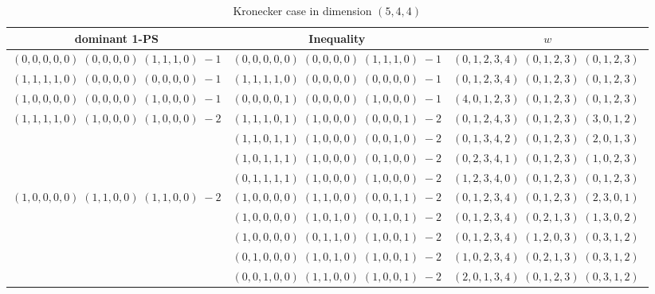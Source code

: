 \documentclass[11pt]{article}
\begin{document}
 
 \begin{longtable}[l]{|c|c|c|} 
 \caption{Kronecker case in dimension $(5,4,4)$} \\  
 
 \hline 
 \textrm{dominant 1-PS} & \textrm{Inequality} & $w$ \\ 
 \hline\multirow[t]{1}{*}{ $(0 ,0 ,0 ,0 ,0) \;(0 ,0 ,0 ,0) \;(1 ,1 ,1 ,0) \;-1$ }  & $(0 ,0 ,0 ,0 ,0) \;(0 ,0 ,0 ,0) \;(1 ,1 ,1 ,0) \;-1$ & $(0 ,1 ,2 ,3 ,4) \;(0 ,1 ,2 ,3) \;(0 ,1 ,2 ,3) \;$\\ \hline\multirow[t]{1}{*}{ $(1 ,1 ,1 ,1 ,0) \;(0 ,0 ,0 ,0) \;(0 ,0 ,0 ,0) \;-1$ }  & $(1 ,1 ,1 ,1 ,0) \;(0 ,0 ,0 ,0) \;(0 ,0 ,0 ,0) \;-1$ & $(0 ,1 ,2 ,3 ,4) \;(0 ,1 ,2 ,3) \;(0 ,1 ,2 ,3) \;$\\ \hline\multirow[t]{1}{*}{ $(1 ,0 ,0 ,0 ,0) \;(0 ,0 ,0 ,0) \;(1 ,0 ,0 ,0) \;-1$ }  & $(0 ,0 ,0 ,0 ,1) \;(0 ,0 ,0 ,0) \;(1 ,0 ,0 ,0) \;-1$ & $(4 ,0 ,1 ,2 ,3) \;(0 ,1 ,2 ,3) \;(0 ,1 ,2 ,3) \;$\\ \hline\multirow[t]{4}{*}{ $(1 ,1 ,1 ,1 ,0) \;(1 ,0 ,0 ,0) \;(1 ,0 ,0 ,0) \;-2$ }  & $(1 ,1 ,1 ,0 ,1) \;(1 ,0 ,0 ,0) \;(0 ,0 ,0 ,1) \;-2$ & $(0 ,1 ,2 ,4 ,3) \;(0 ,1 ,2 ,3) \;(3 ,0 ,1 ,2) \;$\\ 
 \cline{2-3} 
 & $(1 ,1 ,0 ,1 ,1) \;(1 ,0 ,0 ,0) \;(0 ,0 ,1 ,0) \;-2$ & $(0 ,1 ,3 ,4 ,2) \;(0 ,1 ,2 ,3) \;(2 ,0 ,1 ,3) \;$\\ 
 \cline{2-3} 
 & $(1 ,0 ,1 ,1 ,1) \;(1 ,0 ,0 ,0) \;(0 ,1 ,0 ,0) \;-2$ & $(0 ,2 ,3 ,4 ,1) \;(0 ,1 ,2 ,3) \;(1 ,0 ,2 ,3) \;$\\ 
 \cline{2-3} 
 & $(0 ,1 ,1 ,1 ,1) \;(1 ,0 ,0 ,0) \;(1 ,0 ,0 ,0) \;-2$ & $(1 ,2 ,3 ,4 ,0) \;(0 ,1 ,2 ,3) \;(0 ,1 ,2 ,3) \;$\\ \hline\multirow[t]{6}{*}{ $(1 ,0 ,0 ,0 ,0) \;(1 ,1 ,0 ,0) \;(1 ,1 ,0 ,0) \;-2$ }  & $(1 ,0 ,0 ,0 ,0) \;(1 ,1 ,0 ,0) \;(0 ,0 ,1 ,1) \;-2$ & $(0 ,1 ,2 ,3 ,4) \;(0 ,1 ,2 ,3) \;(2 ,3 ,0 ,1) \;$\\ 
 \cline{2-3} 
 & $(1 ,0 ,0 ,0 ,0) \;(1 ,0 ,1 ,0) \;(0 ,1 ,0 ,1) \;-2$ & $(0 ,1 ,2 ,3 ,4) \;(0 ,2 ,1 ,3) \;(1 ,3 ,0 ,2) \;$\\ 
 \cline{2-3} 
 & $(1 ,0 ,0 ,0 ,0) \;(0 ,1 ,1 ,0) \;(1 ,0 ,0 ,1) \;-2$ & $(0 ,1 ,2 ,3 ,4) \;(1 ,2 ,0 ,3) \;(0 ,3 ,1 ,2) \;$\\ 
 \cline{2-3} 
 & $(0 ,1 ,0 ,0 ,0) \;(1 ,0 ,1 ,0) \;(1 ,0 ,0 ,1) \;-2$ & $(1 ,0 ,2 ,3 ,4) \;(0 ,2 ,1 ,3) \;(0 ,3 ,1 ,2) \;$\\ 
 \cline{2-3} 
 & $(0 ,0 ,1 ,0 ,0) \;(1 ,1 ,0 ,0) \;(1 ,0 ,0 ,1) \;-2$ & $(2 ,0 ,1 ,3 ,4) \;(0 ,1 ,2 ,3) \;(0 ,3 ,1 ,2) \;$\\ 

\end{longtable}
\end{document}
